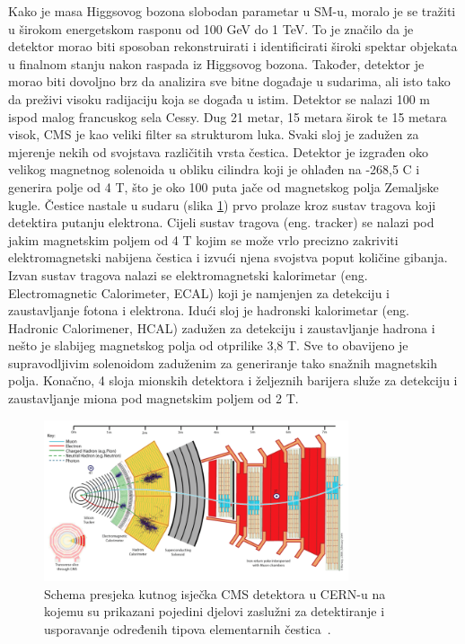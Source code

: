 \documentclass[12pt,a4paper,oneside]{article}
\begin{document}
\begin{linenumbers}
		Kako je masa Higgsovog bozona slobodan parametar u SM-u, moralo je se tražiti u širokom energetskom rasponu od 100 GeV do 1 TeV. To je značilo da je detektor morao biti sposoban rekonstruirati i identificirati široki spektar objekata u finalnom stanju nakon raspada iz Higgsovog bozona. Također, detektor je morao biti dovoljno brz da analizira sve bitne događaje u sudarima, ali isto tako da preživi visoku radijaciju koja se događa u istim.
		Detektor se nalazi 100 m ispod malog francuskog sela Cessy. Dug 21 metar, 15 metara širok te 15 metara visok, CMS je kao veliki filter sa strukturom luka. Svaki sloj je zadužen za mjerenje nekih od svojstava različitih vrsta čestica. Detektor je izgrađen oko velikog magnetnog solenoida u obliku cilindra koji je ohlađen na -268,5 \degree C i generira polje od 4  T, što je oko 100 puta jače od magnetskog polja Zemaljske kugle.
		Čestice nastale u sudaru  (slika \ref{sl1:cms-scheme}) prvo prolaze kroz sustav tragova koji detektira putanju elektrona. Cijeli sustav tragova (eng. tracker) se nalazi pod jakim magnetskim poljem od 4 T kojim se može vrlo precizno zakriviti elektromagnetski nabijena čestica i izvući njena svojstva poput količine gibanja. Izvan sustav tragova nalazi se elektromagnetski kalorimetar (eng. Electromagnetic Calorimeter, ECAL) koji je namjenjen za detekciju i zaustavljanje fotona i elektrona. Idući sloj je hadronski kalorimetar (eng. Hadronic Calorimener, HCAL) zadužen za detekciju i zaustavljanje hadrona i nešto je slabijeg magnetskog polja od otprilike 3,8 T. Sve to obavijeno je supravodljivim solenoidom zaduženim za generiranje tako snažnih magnetskih polja. Konačno, 4 sloja mionskih detektora i željeznih barijera služe za detekciju i zaustavljanje miona pod magnetskim poljem od 2 T.
		\begin{figure}[H]
			\centering
			\includegraphics[width=0.8\textwidth]{cms-scheme.png}
			\caption[Saturn viđen u ultraljubičastom svjetlu.]{\label{sl1:cms-scheme}Schema presjeka kutnog isječka CMS detektora u CERN-u na kojemu su prikazani pojedini djelovi zaslužni za detektiranje i usporavanje određenih tipova elementarnih čestica~\cite{cern-slika}. }
		\end{figure}
	

\end{linenumbers}
\end{document}
